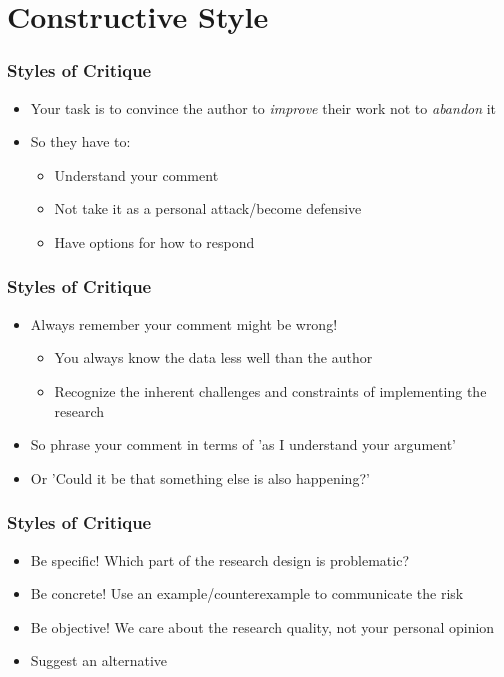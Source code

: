 \documentclass[xcolor=x11names,compress]{beamer}\usepackage[]{graphicx}\usepackage[]{color}
\renewcommand{\(}{\begin{columns}}
\renewcommand{\)}{\end{columns}}
\newcommand{\<}[1]{\begin{column}{#1}}
\renewcommand{\>}{\end{column}}
\begin{document}
\section{Constructive Style}

\begin{frame}
\frametitle{Styles of Critique}
\begin{itemize}
\item Your task is to convince the author to \textit{improve} their work not to \textit{abandon} it
\item So they have to:
\begin{itemize}
\item Understand your comment
\item Not take it as a personal attack/become defensive
\item Have options for how to respond
\end{itemize}
\end{itemize}
\end{frame}

\begin{frame}
\frametitle{Styles of Critique}
\begin{itemize}
\item Always remember your comment might be wrong!
\begin{itemize}
\item You always know the data less well than the author
\item Recognize the inherent challenges and constraints of implementing the research
\end{itemize}
\item So phrase your comment in terms of 'as I understand your argument'
\item Or 'Could it be that something else is also happening?'
\end{itemize}
\end{frame}

\begin{frame}
\frametitle{Styles of Critique}
\begin{itemize}
\item Be specific! Which part of the research design is problematic?
\item Be concrete! Use an example/counterexample to communicate the risk
\item Be objective! We care about the research quality, not your personal opinion
\item Suggest an alternative
\end{itemize}
\end{frame}
\end{document}
